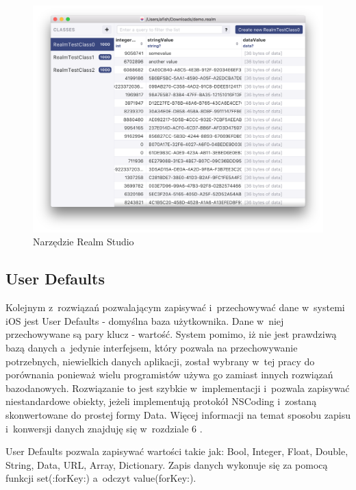 \begin{figure}[h]
	\includegraphics[width=\linewidth]{img/RealmStudio.png}
	\caption{Narzędzie Realm Studio}
	\label{fig: RealmStudio}
\end{figure}

\subsection{User Defaults}

Kolejnym z~rozwiązań pozwalającym zapisywać i~przechowywać dane w~systemi iOS jest User Defaults - domyślna baza użytkownika. Dane w~niej przechowywane są pary klucz - wartość. System pomimo, iż nie jest prawdziwą bazą danych a~jedynie interfejsem, który pozwala na przechowywanie potrzebnych, niewielkich danych aplikacji, został wybrany w~tej pracy do porównania ponieważ wielu programistów używa go zamiast innych rozwiązań bazodanowych. Rozwiązanie to jest szybkie w~implementacji i~pozwala zapisywać niestandardowe obiekty, jeżeli implementują protokół NSCoding i~zostaną skonwertowane do prostej formy Data. Więcej informacji na temat sposobu zapisu i~konwersji danych znajduję się w~rozdziale 6 . \par
  
User Defaults pozwala zapisywać wartości takie jak: Bool, Integer, Float, Double, String, Data, URL, Array, Dictionary. Zapis danych wykonuje się za pomocą funkcji set(:forKey:) a~odczyt value(forKey:). 